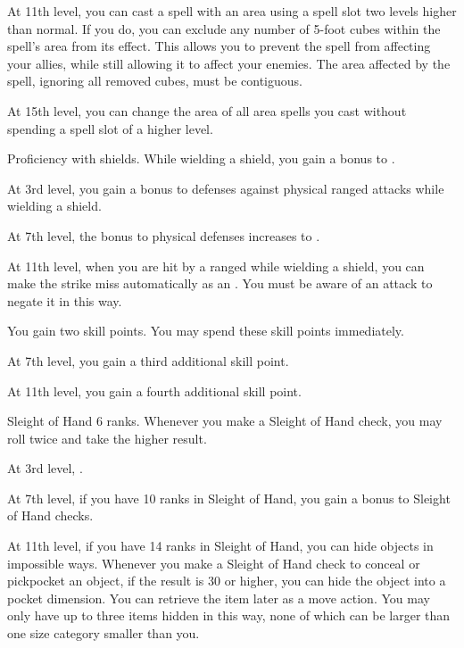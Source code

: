     At 11th level, you can cast a spell with an area using a spell slot two levels higher than normal.
    If you do, you can exclude any number of 5-foot cubes within the spell's area from its effect.
    This allows you to prevent the spell from affecting your allies, while still allowing it to affect your enemies.
    The area affected by the spell, ignoring all removed cubes, must be contiguous.

    At 15th level, you can change the area of all area spells you cast without spending a spell slot of a higher level.

    \featpre Proficiency with shields.
    \featben While wielding a shield, you gain a  bonus to .

    At 3rd level, you gain a  bonus to defenses against physical ranged attacks while wielding a shield.

    At 7th level, the bonus to physical defenses increases to .

    At 11th level, when you are hit by a ranged  while wielding a shield, you can make the strike miss automatically as an .
    You must be aware of an attack to negate it in this way.

    \featben You gain two skill points.
    You may spend these skill points immediately.

    At 7th level, you gain a third additional skill point.

    At 11th level, you gain a fourth additional skill point.

    \featpre Sleight of Hand 6 ranks.
    \featben Whenever you make a Sleight of Hand check, you may roll twice and take the higher result.

    At 3rd level, \tdash.

    At 7th level, if you have 10 ranks in Sleight of Hand, you gain a  bonus to Sleight of Hand checks.

    At 11th level, if you have 14 ranks in Sleight of Hand, you can hide objects in impossible ways.
    Whenever you make a Sleight of Hand check to conceal or pickpocket an object, if the result is 30 or higher, you can hide the object into a pocket dimension.
    You can retrieve the item later as a move action.
    You may only have up to three items hidden in this way, none of which can be larger than one size category smaller than you.
    \magical

